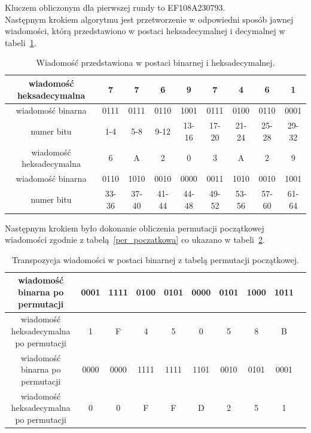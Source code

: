 \documentclass[12p]{article}
\begin{document}
Kluczem obliczonym dla pierwszej rundy to EF108A230793.\\


Następnym krokiem algorytmu jest przetworzenie w odpowiedni sposób jawnej wiadomości, którą przedstawiono w postaci heksadecymalnej i decymalnej w tabeli~\ref{wiadomosc}.

\begin{table}[H]
\centering
\begin{tabular}{|c|c|c|c|c|c|c|c|c|}
\hline
wiadomość heksadecymalna & 7 & 7 & 6 & 9 & 7 & 4 & 6 & 1\\ \hline
wiadomość binarna & 0111 & 0111 & 0110 & 1001 & 0111 & 0100 & 0110 & 0001\\ \hline
numer bitu & 1-4 & 5-8 & 9-12 & 13-16 & 17-20 & 21-24 & 25-28 & 29-32\\ \hline
wiadomość heksadecymalna & 6 & A & 2 & 0 & 3 & A & 2 & 9\\ \hline
wiadomość binarna & 0110 & 1010 & 0010 & 0000 & 0011 & 1010 & 0010 & 1001\\ \hline
numer bitu & 33-36 & 37-40 & 41-44 & 44-48 & 49-52 & 53-56 & 57-60 & 61-64\\ \hline
\end{tabular}
\caption{Wiadomość przedstawiona w postaci binarnej i heksadecymalnej.}\label{wiadomosc}
\end{table}

Następnym krokiem było dokonanie obliczenia permutacji początkowej wiadomości zgodnie z tabelą~\ref{per_poczatkowa} co ukazano w tabeli~\ref{per}.

\begin{table}[H]
\centering
\begin{tabular}{|c|c|c|c|c|c|c|c|c|c|}
\hline
wiadomość binarna po permutacji & 0001 & 1111 & 0100 & 0101 & 0000 & 0101 & 1000 & 1011\\ \hline
wiadomość heksadecymalna po permutacji & 1 & F & 4 & 5 & 0 & 5 & 8 & B\\ \hline
wiadomość binarna po permutacji & 0000 & 0000 & 1111 & 1111 & 1101 & 0010 & 0101 & 0001\\ \hline
wiadomość heksadecymalna po permutacji & 0 & 0 & F & F & D & 2 & 5 & 1\\ \hline

\end{tabular}
\caption{Transpozycja wiadomości w postaci binarnej z tabelą permutacji początkowej.}\label{per}
\end{table}
\end{document}
